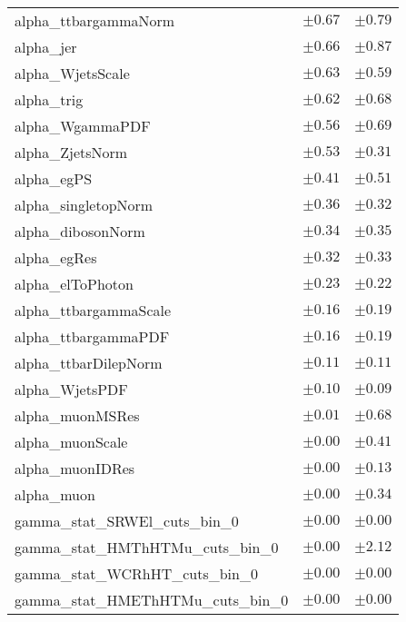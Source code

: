 \begin{table}
\begin{center}
\begin{tabular*}{\textwidth}{@{\extracolsep{\fill}}lcc}
alpha\_ttbargammaNorm         & $\pm 0.67$          & $\pm 0.79$       \\
alpha\_jer         & $\pm 0.66$          & $\pm 0.87$       \\
alpha\_WjetsScale         & $\pm 0.63$          & $\pm 0.59$       \\
alpha\_trig         & $\pm 0.62$          & $\pm 0.68$       \\
alpha\_WgammaPDF         & $\pm 0.56$          & $\pm 0.69$       \\
alpha\_ZjetsNorm         & $\pm 0.53$          & $\pm 0.31$       \\
alpha\_egPS         & $\pm 0.41$          & $\pm 0.51$       \\
alpha\_singletopNorm         & $\pm 0.36$          & $\pm 0.32$       \\
alpha\_dibosonNorm         & $\pm 0.34$          & $\pm 0.35$       \\
alpha\_egRes         & $\pm 0.32$          & $\pm 0.33$       \\
alpha\_elToPhoton         & $\pm 0.23$          & $\pm 0.22$       \\
alpha\_ttbargammaScale         & $\pm 0.16$          & $\pm 0.19$       \\
alpha\_ttbargammaPDF         & $\pm 0.16$          & $\pm 0.19$       \\
alpha\_ttbarDilepNorm         & $\pm 0.11$          & $\pm 0.11$       \\
alpha\_WjetsPDF         & $\pm 0.10$          & $\pm 0.09$       \\
alpha\_muonMSRes         & $\pm 0.01$          & $\pm 0.68$       \\
alpha\_muonScale         & $\pm 0.00$          & $\pm 0.41$       \\
alpha\_muonIDRes         & $\pm 0.00$          & $\pm 0.13$       \\
alpha\_muon         & $\pm 0.00$          & $\pm 0.34$       \\
gamma\_stat\_SRWEl\_cuts\_bin\_0         & $\pm 0.00$          & $\pm 0.00$       \\
gamma\_stat\_HMThHTMu\_cuts\_bin\_0         & $\pm 0.00$          & $\pm 2.12$       \\
gamma\_stat\_WCRhHT\_cuts\_bin\_0         & $\pm 0.00$          & $\pm 0.00$       \\
gamma\_stat\_HMEThHTMu\_cuts\_bin\_0         & $\pm 0.00$          & $\pm 0.00$       \\

\end{tabular*}
\end{center}
\end{table}
